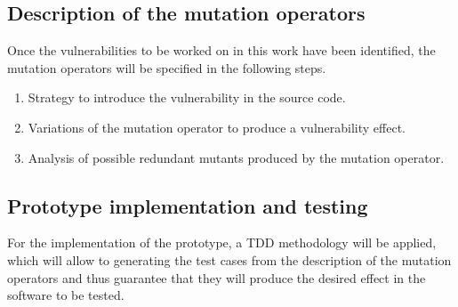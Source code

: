 \subsection{Description of the mutation operators}

Once the vulnerabilities to be worked on in this work have been identified, the mutation operators will be specified in the following steps.

\begin{enumerate}
    \item Strategy to introduce the vulnerability in the source code.
    \item Variations of the mutation operator to produce a vulnerability effect.
    \item Analysis of possible redundant mutants produced by the mutation operator.
\end{enumerate}

\subsection{Prototype implementation and testing}

For the implementation of the prototype, a TDD methodology\cite{williams2003test} will be applied, which will allow to generating the test cases from the description of the mutation operators and thus guarantee that they will produce the desired effect in the software to be tested.
